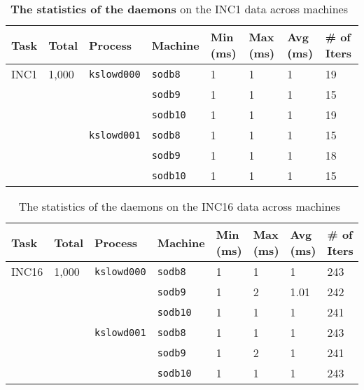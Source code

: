 \documentclass[10pt]{article}
\begin{document}
\begin{table}[htp!]
\centering
{\small
 \begin{tabular}{|l|l|l|l|l||l|l|l|} \hline
 Task & Total & Process & Machine & Min (ms) & Max (ms) & Avg (ms) & \# of Iters\\ \hline
 INC1 &  1,000 & {\tt kslowd000} & {\tt sodb8} & 1 & 1 & 1 & 19 \\ \hline
 &   &  & {\tt sodb9} & 1 & 1 & 1 & 15 \\ \hline
 &   &  & {\tt sodb10} & 1 & 1 & 1 & 19 \\ \hline 
 \hline
  &  & {\tt kslowd001} & {\tt sodb8} & 1 & 1 & 1 & 15 \\ \hline
 &   &  & {\tt sodb9} & 1 & 1 & 1 & 18 \\ \hline
 &   &  & {\tt sodb10} & 1 & 1 & 1 & 15 \\ \hline 
 \end{tabular}
  }
 \caption{\textbf{The statistics of the daemons} on the INC1 data across machines~\label{tab:inc1}}
\end{table}

\begin{table}[htp!]
\centering
{\small
 \begin{tabular}{|l|l|l|l|l||l|l|l|} \hline
 Task & Total & Process & Machine & Min (ms) & Max (ms) & Avg (ms) & \# of Iters\\ \hline
 INC16 &  1,000 & {\tt kslowd000} & {\tt sodb8} & 1 & 1 & 1 & 243 \\ \hline
 &   &  & {\tt sodb9} & 1 & 2 & 1.01 & 242 \\ \hline
 &   &  & {\tt sodb10} & 1 & 1 & 1 & 241 \\ \hline 
 \hline
  &  & {\tt kslowd001} & {\tt sodb8} & 1 & 1 & 1 & 243 \\ \hline
 &   &  & {\tt sodb9} & 1 & 2 & 1 & 241 \\ \hline
 &   &  & {\tt sodb10} & 1 & 1 & 1 & 243 \\ \hline 
 \end{tabular}
  }
 \caption{The statistics of the daemons on the INC16 data across machines~\label{tab:inc16}}
\end{table}
\end{document}
